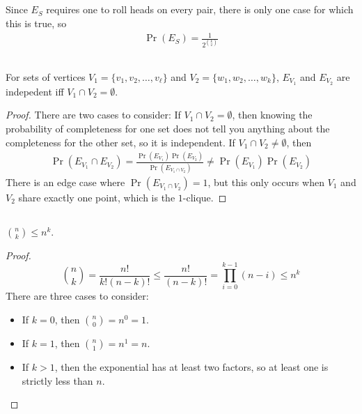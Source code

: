 \documentclass{article}
\begin{document}
\subsection{}

Since \(E_S\) requires one to roll heads on every pair, there is only one case for which this is true, so
\begin{align}
    \Pr(E_S) = \frac{1}{2^{\binom{k}{2}}}
\end{align}

\subsection{}

\begin{theorem}
    For sets of vertices \(V_1 = \{v_1, v_2, \ldots, v_\ell\}\) and \(V_2 = \{w_1, w_2, \ldots, w_k\}\), \(E_{V_1}\) and \(E_{V_2}\) are indepedent iff \(V_1 \cap V_2 = \emptyset\).
\end{theorem}
\begin{proof}
    There are two cases to consider:
    If \(V_1 \cap V_2 = \emptyset\), then knowing the probability of completeness for one set does not tell you anything about the completeness for the other set, so it is independent.
    If \(V_1 \cap V_2 \neq \emptyset\), then
    \begin{align}
        \Pr(E_{V_1} \cap E_{V_2})  = \frac{\Pr(E_{V_1}) \Pr(E_{V_2})}{\Pr(E_{V_1 \cap V_2})} \neq \Pr(E_{V_1}) \Pr(E_{V_2})
    \end{align}
    There is an edge case where \(\Pr(E_{V_1 \cap V_2}) = 1\), but this only occurs when \(V_1\) and \(V_2\) share exactly one point, which is the \(1\)-clique.
\end{proof}

\subsection{}

\begin{theorem}
    \(\binom{n}{k} \leqslant n^k\).
\end{theorem}
\begin{proof}
    \begin{equation}
        \binom{n}{k} = \frac{n!}{k! (n - k)!} \leqslant \frac{n!}{(n - k)!} = \prod_{i = 0}^{k - 1} (n - i) \leqslant n^k
    \end{equation}
    There are three cases to consider:
    \begin{itemize}
        \item If \(k = 0\), then \(\binom{n}{0} = n^0 = 1\).
        \item If \(k = 1\), then \(\binom{n}{1} = n^1 = n\).
        \item If \(k > 1\), then the exponential has at least two factors, so at least one is strictly less than \(n\).
    \end{itemize}
\end{proof}
\end{document}
